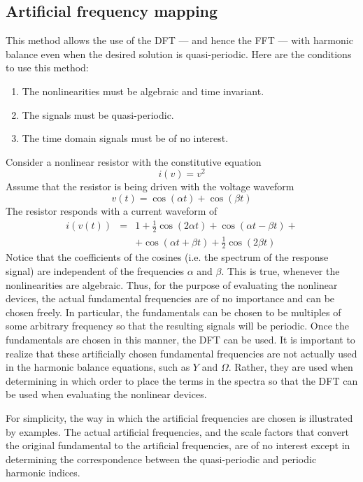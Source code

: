 \subsection{Artificial frequency mapping} \label{subsection:freq}

This method allows the use of the DFT --- and hence the FFT --- with
harmonic balance even when the desired solution is quasi-periodic.
Here are the conditions to use this method:
\begin{enumerate}
\item The nonlinearities must be algebraic and time invariant.
\item The signals must be quasi-periodic.
\item The time domain signals must be of no interest.
\end{enumerate}

Consider a nonlinear resistor with the constitutive equation
\[
  i(v) = v^2
\]
Assume that the resistor is being driven with the voltage waveform 
\[
  v(t) = \cos(\alpha t) + \cos(\beta t)
\]
The resistor responds with a current waveform of
\[
  \begin{array}{ccl}
  i(v(t)) & = & 1 + \frac{1}{2} \cos(2 \alpha t) +
                    \cos(\alpha t - \beta t) + \\
          &   & +  \cos(\alpha t + \beta t) +
                   \frac{1}{2} \cos(2 \beta t) 
  \end{array}
\]
Notice that the coefficients of the cosines (i.e. the spectrum of the
response signal) are independent of the frequencies $\alpha$ and
$\beta$. This is true, whenever the nonlinearities are
algebraic. Thus, for the purpose of evaluating the nonlinear devices,
the actual fundamental frequencies are of no importance and can be
chosen freely. In particular, the fundamentals can be chosen to be
multiples of some arbitrary frequency so that the resulting signals
will be periodic. Once the fundamentals are chosen in this manner, the
DFT can be used. It is important to realize that these artificially
chosen fundamental frequencies are not actually used in the harmonic
balance equations, such as $Y$ and $\Omega$. Rather, they are used
when determining in which order to place the terms in the spectra so
that the DFT can be used when evaluating the nonlinear devices.

For simplicity, the way in which the artificial frequencies are chosen
is illustrated by examples. The actual artificial frequencies, and the
scale factors that convert the original fundamental to the artificial
frequencies, are of no interest except in determining the
correspondence between the quasi-periodic and periodic harmonic indices.


